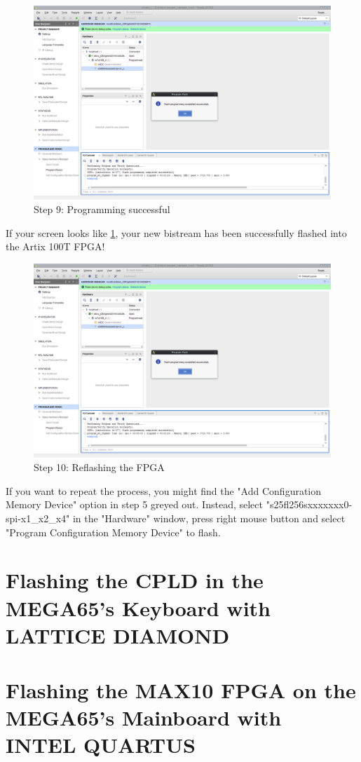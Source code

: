 \begin{figure}
  \includegraphics[width=\linewidth]{images/vivado09.png}
  \caption{Step 9: Programming successful}
  \label{fig:vivado09}
\end{figure}

If your screen looks like \ref{fig:vivado09}, your new bistream has been successfully flashed into the Artix 100T FPGA!

\begin{figure}
  \includegraphics[width=\linewidth]{images/vivado09.png}
  \caption{Step 10: Reflashing the FPGA}
  \label{fig:vivado10}
\end{figure}

If you want to repeat the process, you might find the "Add Configuration Memory Device" option in step 5 greyed out. Instead, select "s25fl256sxxxxxxx0-spi-x1\_x2\_x4"  in the "Hardware" window, press right mouse button and select "Program Configuration Memory Device" to flash.

\section{Flashing the CPLD in the MEGA65's Keyboard with LATTICE DIAMOND}

\section{Flashing the MAX10 FPGA on the MEGA65's Mainboard with INTEL QUARTUS}
